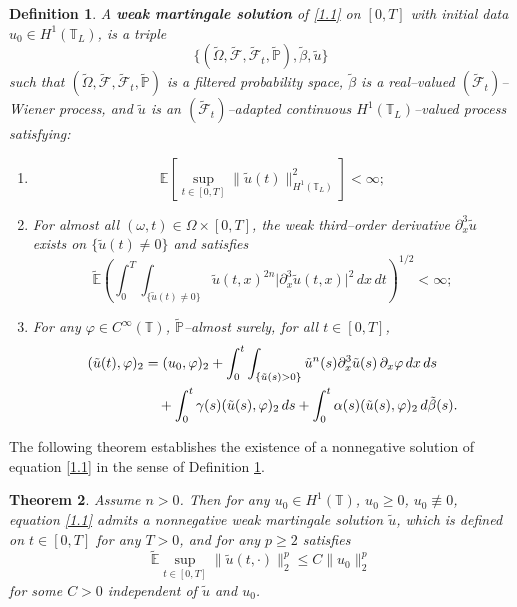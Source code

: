 \documentclass[a4paper,12pt]{article}
\newtheorem{definition}{Definition}[section]
\newtheorem{theorem}[definition]{Theorem}
\numberwithin{equation}{section}
\def\E{\mathbb{E}}
\begin{document}
\begin{definition}\label{Def:2.1}
A {\bf weak martingale solution} of \eqref{1.1} on $[0,T]$ with
initial data $u_0 \in H^1(\mathbb{T}_L)$,
is a triple
\[
\{(\tilde{\Omega},\tilde{\mathcal{F}}, \tilde{\mathcal{F}}_t,\tilde{\mathbb{P}}), \tilde{\beta}, \tilde{u}\}
\]
such that $(\tilde{\Omega},\tilde{\mathcal{F}}, \tilde{\mathcal{F}}_t,\tilde{\mathbb{P}})$ is a filtered probability space,
$ \tilde{\beta}$ is a real--valued $(\tilde{\mathcal{F}}_t)$--Wiener process, and
$\tilde{u}$ is an $(\tilde{\mathcal{F}}_t)$--adapted continuous $H^1(\mathbb{T}_L)$--valued process
satisfying:
\begin{enumerate}
\item
\[
\mathbb{E}\!\left[\sup_{t\in[0,T]}\|\tilde{u}(t)\|_{H^1(\mathbb{T}_L)}^2\right] < \infty;
\]

\item
For almost all $(\omega,t) \in \Omega \times [0,T]$, the weak third--order derivative
$\partial_x^3 \tilde{u}$ exists on $\{\tilde{u}(t) \neq 0\}$ and satisfies
\[
\tilde{\mathbb{E}}\!\left(\int_0^T \!\!\int_{\{\tilde{u}(t) \neq 0\}}
\tilde{u}(t,x)^{2n} \bigl|\partial_x^3 \tilde{u}(t,x)\bigr|^2 \, dx \, dt \right)^{1/2}< \infty;
\]

\item
For any $\varphi \in C^\infty(\mathbb{T})$, $\tilde{\mathbb{P}}$--almost surely,
for all $t \in [0,T]$,
\begin{align}
(\tilde{u}(t),\varphi)_2
&= (u_0,\varphi)_2
+ \int_0^t \int_{\{\tilde{u}(s)>0\}}
\tilde{u}^n(s) \partial_x^3 \tilde{u}(s)\,\partial_x \varphi \, dx\,ds \notag \\
&\quad
+ \int_0^t \gamma(s)(\tilde{u}(s),\varphi)_2\,ds
+ \int_0^t \alpha(s)(\tilde{u}(s),\varphi)_2\,d \tilde{\beta}(s).
\label{2.1}
\end{align}
\end{enumerate}
\end{definition}

\medskip

The following theorem establishes the existence of a nonnegative solution of equation \eqref{1.1}
in the sense of Definition \ref{Def:2.1}.

\begin{theorem}\label{Th:2.1}
Assume $n > 0$. Then for any
$u_0 \in H^1(\mathbb{T})$, $u_0 \ge 0$, $u_0 \not\equiv 0$,
equation \eqref{1.1} admits a nonnegative weak martingale solution $\tilde{u}$, which is defined on $t \in [0,T]$ for any $T > 0$, and for any $p \geq 2$ satisfies
\[
\tilde{\E} \sup_{t \in [0,T]} \|\tilde{u}(t,\cdot)\|_2^p \leq C \| u_0\|^p_2
\]
for some $C>0$ independent of $\tilde{u}$ and $u_0$.
\end{theorem}
\end{document}

